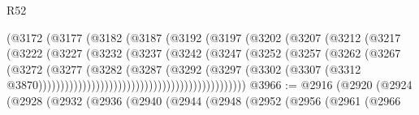 \begin{lexlean}{R52}
\begin{coremodule}
{{{{{{{{{{{{{{{{{{{{{{{{{{{{{{{{{{{{{{{{{{{{{{{{{{{{{{{{{{{{{{{{{{{{{{{{{{{{{{{{{{{{{{{{{{{{{{{{{{{{{{{{{{{{{{{{{{{{{{{{{{{{{{{{{{{{{{{{{{{{{{{{{{{{{{{{{{{{{{{{{{{{{{{{{{{{{{{{{{{{{{{{{{{{{{{{{{{{{{                                        (@3172
                                          (@3177
                                            (@3182
                                              (@3187
                                                (@3192
                                                  (@3197
                                                    (@3202
                                                      (@3207
                                                        (@3212
                                                          (@3217
                                                            (@3222
                                                              (@3227
                                                                (@3232
                                                                  (@3237
                                                                    (@3242
                                                                      (@3247
                                                                        (@3252
                                                                          (@3257
                                                                            (@3262
                                                                              (@3267
                                                                                (@3272
                                                                                  (@3277
                                                                                    (@3282
                                                                                      (@3287
                                                                                        (@3292
                                                                                          (@3297
                                                                                            (@3302
                                                                                              (@3307
                                                                                                (@3312
                                                                                                  @3870)))))))))))))))))))))))))))))))))))))))))))))))
@3966 := @2916
    (@2920
      (@2924
        (@2928
          (@2932
            (@2936
              (@2940
                (@2944
                  (@2948
                    (@2952
                      (@2956
                        (@2961
                          (@2966
}}}}}}}}}}}}}}}}}}}}}}}}}}}}}}}}}}}}}}}}}}}}}}}}}}}}}}}}}}}}}}}}}}}}}}}}}}}}}}}}}}}}}}}}}}}}}}}}}}}}}}}}}}}}}}}}}}}}}}}}}}}}}}}}}}}}}}}}}}}}}}}}}}}}}}}}}}}}}}}}}}}}}}}}}}}}}}}}}}}}}}}}}}}}}}}}}}}}}}
\end{coremodule}
\end{lexlean}
